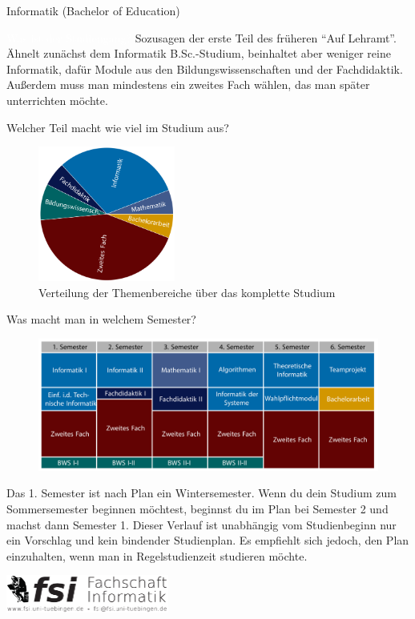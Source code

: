 	\begin{Huge}
			Informatik (Bachelor of Education)
		\end{Huge}
		\begin{exampleblock}{\textcolor{white}{Was ist der Studiengang?}}
			Sozusagen der erste Teil des früheren "`Auf Lehramt"'. Ähnelt zunächst dem Informatik B.Sc.-Studium, beinhaltet aber weniger reine Informatik, dafür Module aus den Bildungswissenschaften und der Fachdidaktik. Außerdem muss man mindestens ein zweites Fach wählen, das man später unterrichten möchte.
		\end{exampleblock}
	
	\begin{block}{Welcher Teil macht wie viel im Studium aus?}
		\begin{figure}[h!]
			\includegraphics[width=0.4\textwidth]{charts/lehramt_informatik_piechartonly.pdf}
			\caption{Verteilung der Themenbereiche über das komplette Studium}
		\end{figure}
	\end{block}
	
	\begin{block}{Was macht man in welchem Semester?}
		\begin{figure}[h!]
			\includegraphics[width=\textwidth]{charts/lehramt_informatik_Studienplanonly.pdf}
		\end{figure}
		Das 1. Semester ist nach Plan ein Wintersemester. Wenn du dein Studium zum Sommersemester beginnen möchtest, beginnst du im Plan bei Semester 2 und machst dann Semester 1. 
		Dieser Verlauf ist unabhängig vom Studienbeginn nur ein Vorschlag und kein bindender Studienplan. Es empfiehlt sich jedoch, den Plan einzuhalten, wenn man in Regelstudienzeit studieren möchte.
	\end{block}
\vfill
\begin{flushright}
	\includegraphics[width=0.4\textwidth]{fsilogo.pdf}
\end{flushright}